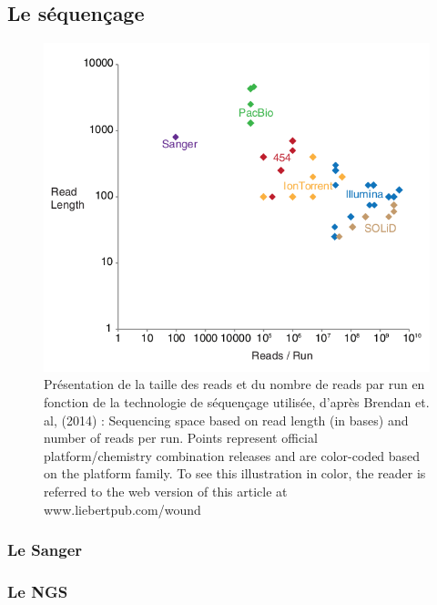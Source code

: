 \documentclass[12pt,twoside]{reedthesis}
\theoremstyle{definition}
\theoremstyle{definition}
\theoremstyle{remark}
\begin{document}
  \subsection{Le séquençage}\label{le-sequencage}
  
  \begin{figure}
  
  {\centering \includegraphics[scale=.55]{figure/read_per_run} 
  
  }
  
  \caption[Présentation de la taille des reads et du nombre de reads par run en fonction de la technologie de séquençage utilisée, d'après Brendan et. al, (2014)]{Présentation de la taille des reads et du nombre de reads par run en fonction de la technologie de séquençage utilisée, d'après Brendan et. al, (2014) : Sequencing space based on read length (in bases) and number of reads per run. Points represent official platform/chemistry combination releases and are color-coded based on the platform family. To see this illustration in color, the reader is referred to the web version of this article at www.liebertpub.com/wound}\label{fig:readPerRun}
  \end{figure}
  
  \subsubsection{Le Sanger}\label{le-sanger}
  
  \subsubsection{Le NGS}\label{le-ngs}
  
\end{document}
